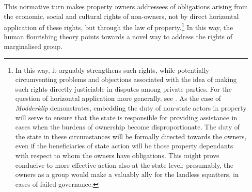 This normative turn makes property owners addressees of obligations arising from the economic, social and cultural rights of non-owners, not by direct horizontal application of these rights, but through the law of property.\footnote{In this way, it arguably strengthens such rights, while potentially circumventing problems and objections associated with the idea of making such rights directly justiciable in disputes among private parties. For the question of horizontal application more generally, see \cite{manisuli07}. As the case of {\it Modderklip} demonstrates, embedding the duty of non-state actors in property will serve to ensure that the state is responsible for providing assistance in cases when the burdens of ownership become disproportionate. The duty of the state in these circumstances will be formally directed towards the owners, even if the beneficiaries of state action will be those property dependants with respect to whom the owners have obligations. This might prove conducive to more effective action also at the state level; presumably, the owners as a group would make a valuably ally for the landless squatters, in cases of failed governance.} In this way, the human flourishing theory points towards a novel way to address the rights of marginalised group. %

